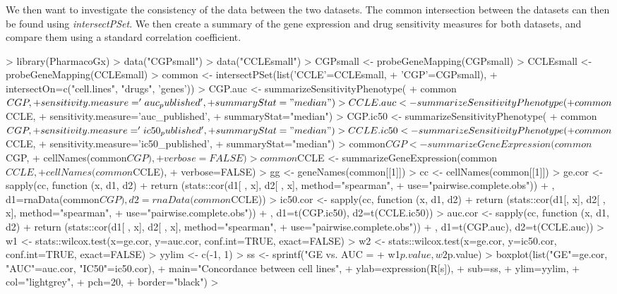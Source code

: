 \documentclass[11pt]{article}
\begin{document}
We then want to investigate the consistency of the data between the two datasets. The common intersection between the datasets can then be found using \textit{intersectPSet}. We then create a summary of the gene expression and drug sensitivity measures for both datasets, and compare them using a standard correlation coefficient. 

\begin{Schunk}
\begin{Sinput}
>   library(PharmacoGx)
>   data("CGPsmall")
>   data("CCLEsmall")
>   CGPsmall <- probeGeneMapping(CGPsmall) 
>   CCLEsmall <- probeGeneMapping(CCLEsmall) 
>   common <- intersectPSet(list('CCLE'=CCLEsmall,
+                                'CGP'=CGPsmall),
+                           intersectOn=c("cell.lines", "drugs", 'genes'))
>   CGP.auc <- summarizeSensitivityPhenotype(
+                 common$CGP, 
+                 sensitivity.measure='auc_published', 
+                 summaryStat="median")
>   CCLE.auc <- summarizeSensitivityPhenotype(
+                 common$CCLE, 
+                 sensitivity.measure='auc_published', 
+                 summaryStat="median")
>   CGP.ic50 <- summarizeSensitivityPhenotype(
+                 common$CGP, 
+                 sensitivity.measure='ic50_published', 
+                 summaryStat="median")
>   CCLE.ic50 <- summarizeSensitivityPhenotype(
+                 common$CCLE, 
+                 sensitivity.measure='ic50_published', 
+                 summaryStat="median")
>   common$CGP <- summarizeGeneExpression(common$CGP, 
+                                         cellNames(common$CGP),
+                                         verbose=FALSE)
>   common$CCLE <- summarizeGeneExpression(common$CCLE, 
+                                          cellNames(common$CCLE),
+                                          verbose=FALSE)
>   gg <- geneNames(common[[1]])
>   cc <- cellNames(common[[1]])
>   ge.cor <- sapply(cc, function (x, d1, d2) {
+     return (stats::cor(d1[ , x], d2[ , x], method="spearman",
+                 use="pairwise.complete.obs"))
+   }, d1=rnaData(common$CGP), d2=rnaData(common$CCLE))
>   ic50.cor <- sapply(cc, function (x, d1, d2) {
+     return (stats::cor(d1[, x], d2[ , x], method="spearman",
+                 use="pairwise.complete.obs"))
+   }, d1=t(CGP.ic50), d2=t(CCLE.ic50))
>   auc.cor <- sapply(cc, function (x, d1, d2) {
+     return (stats::cor(d1[ , x], d2[ , x], method="spearman",
+                 use="pairwise.complete.obs"))
+   }, d1=t(CGP.auc), d2=t(CCLE.auc))
>   w1 <- stats::wilcox.test(x=ge.cor, y=auc.cor, conf.int=TRUE, exact=FALSE)
>   w2 <- stats::wilcox.test(x=ge.cor, y=ic50.cor, conf.int=TRUE, exact=FALSE)
>   yylim <- c(-1, 1)
>   ss <- sprintf("GE vs. AUC = %
+                 w1$p.value, w2$p.value)
>   boxplot(list("GE"=ge.cor, "AUC"=auc.cor, "IC50"=ic50.cor),
+           main="Concordance between cell lines",
+           ylab=expression(R[s]),
+           sub=ss,
+           ylim=yylim,
+           col="lightgrey",
+           pch=20,
+           border="black")
> 
\end{Sinput}
\end{Schunk}
\end{document}
